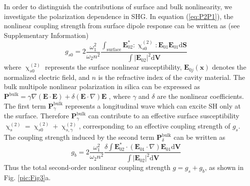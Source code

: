 \documentclass[a4paper,8pt,hyperref, twocolumn, aps, prl]{article}
\begin{document}
In order to distinguish the contributions of surface and bulk nonlinearity, we investigate the polarization dependence in SHG.  
In equation (\ref{eq:P2P1}), the nonlinear coupling strength from surface dipole response can be written as (see Supplementary Information)
\begin{equation}
g_{s0} = 2\frac{\omega_1^2}{\omega_2n^2}\frac{\int_{\mathrm{surface} } \mathbf{E}_{02}^*:\upchi^{(2)}_{s0}:\mathbf{E}_{01}\mathbf{E}_{01} \mathrm{d}	\mathbf{S}}{\int |\mathbf{E}_{02}|^2 \mathrm{d}	\mathbf{V}}
\end{equation}
where $\upchi^{(2)}_{s0}$ represents the surface nonlinear susceptibility, $\mathbf{E}_{0j}(\mathbf{x})$ denotes the  normalized electric field, and $n$ is the refractive index of the cavity material. 
The bulk multipole nonlinear polarization in silica can be expressed as $\mathbf{P}^{\mathrm{bulk}} =  \gamma\nabla(\mathbf{E}\cdot\mathbf{E})+\delta(\mathbf{E}\cdot\nabla)\mathbf{E}$ \cite{bloembergen1968optical}, where $\gamma$ and $\delta$ are the nonlinear coefficients. The first term $\mathbf{P}^{\mathrm{bulk}}_\gamma$ represents a longitudinal wave which can excite SH only at the surface. Therefore $\mathbf{P}^{\mathrm{bulk}}_\gamma$ can contribute to an effective surface susceptibility\cite{heinz1991second} $\upchi^{(2)}_s = \upchi^{(2)}_{s0}+\upchi^{(2)}_{s,\gamma}$, corresponding to an effective coupling strength of $g_s$. The coupling strength induced by the second term $\mathbf{P}^{\mathrm{bulk}}_\delta$ can be written as 
\begin{equation}
g_b =  2\frac{\omega_1^2}{\omega_2n^2}\frac{\delta \int \mathbf{E}_{02}^* \cdot (\mathbf{E}_{01}\cdot\nabla)\mathbf{E}_{01} \mathrm{d}	\mathbf{V}}{\int |\mathbf{E}_{02}|^2 \mathrm{d} \mathbf{V}}
\label{eq:gb}
\end{equation}
Thus the total second-order nonlinear coupling strength $g = g_s+g_b$, as shown in Fig. \ref{pic:Fig3}a.
\end{document}
